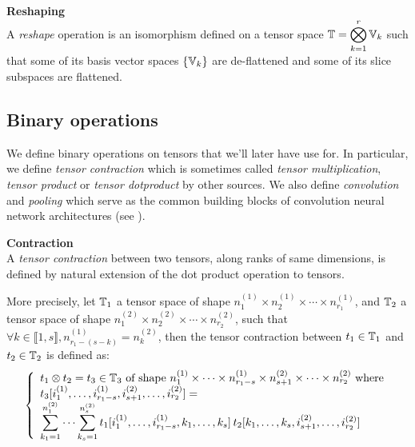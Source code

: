 \begin{definition}\textbf{Reshaping}\\
A \emph{reshape} operation is an isomorphism defined on a tensor space $\mathbb{T} = \displaystyle \bigotimes_{k=1}^r \mathbb{V}_k$ such that some of its basis vector spaces $\{\mathbb{V}_k\}$ are de-flattened and some of its slice subspaces are flattened.
\end{definition}

\subsection{Binary operations}

We define binary operations on tensors that we'll later have use for. In particular, we define  \emph{tensor contraction} which is sometimes called \emph{tensor multiplication}, \emph{tensor product} or \emph{tensor dotproduct} by other sources. We also define \emph{convolution} and \emph{pooling} which serve as the common building blocks of convolution neural network architectures (see ).

\begin{definition}\textbf{Contraction}\\
A \emph{tensor contraction} between two tensors, along ranks of same dimensions, is defined by natural extension of the dot product operation to tensors.

More precisely, let $\mathbb{T}_1$ a tensor space of shape $n_1^{(1)} \times n_2^{(1)} \times \cdots \times n_{r_1}^{(1)}$, and $\mathbb{T}_2$ a tensor space of shape $n_1^{(2)} \times n_2^{(2)} \times \cdots \times n_{r_2}^{(2)}$, such that $\forall k \in \llbracket 1, s \rrbracket, n_{r_1-(s-k)}^{(1)} = n_k^{(2)}$, then the tensor contraction between $t_1 \in \mathbb{T}_1$ and $t_2 \in \mathbb{T}_2$ is defined as:
\begin{gather*}
\left\{
  \begin{array}{l}
    t_1 \otimes t_2 = t_3 \in \mathbb{T}_3 \text{ of shape } n_1^{(1)} \times \cdots \times n_{r_1-s}^{(1)} \times n_{s+1}^{(2)} \times \cdots \times n_{r_2}^{(2)}
    \text{ where} \\
    t_3[i_1^{(1)}, \ldots, i_{r_1-s}^{(1)}, i_{s+1}^{(2)}, \ldots, i_{r_2}^{(2)}] = \\
    \displaystyle \sum_{k_1=1}^{n_1^{(2)}} \cdots \sum_{k_s=1}^{n_s^{(2)}}
    t_1[i_1^{(1)}, \ldots, i_{r_1-s}^{(1)}, k_1, \ldots, k_s] \hspace{2pt}
    t_2[k_1, \ldots, k_s, i_{s+1}^{(2)}, \ldots, i_{r_2}^{(2)}]
  \end{array}
\right.
\end{gather*}
\label{def:contr}
\end{definition}

